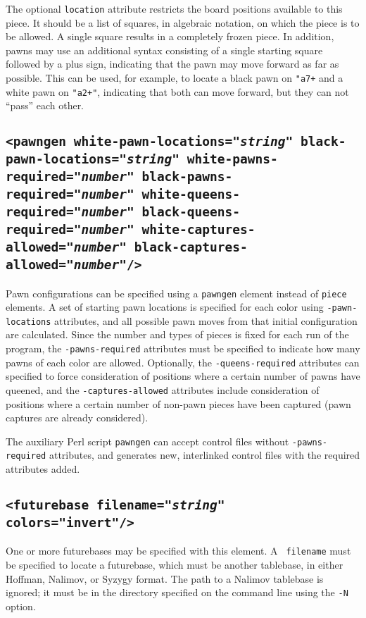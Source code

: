 \documentclass[11pt]{article}
\begin{document}
The optional {\tt location} attribute restricts the board positions
available to this piece.  It should be a list of squares, in algebraic
notation, on which the piece is to be allowed.  A single square
results in a completely frozen piece.  In addition, pawns may use an
additional syntax consisting of a single starting square followed by a
plus sign, indicating that the pawn may move forward as far as
possible.  This can be used, for example, to locate a black pawn on
{\tt "a7+} and a white pawn on {\tt "a2+"}, indicating that both can
move forward, but they can not ``pass'' each other.

\subsection{\tt <pawngen white-pawn-locations="{\it string}" black-pawn-locations="{\it string}" \hfil\break\hbox{\qquad} white-pawns-required="{\it number}" black-pawns-required="{\it number}" \hfil\break\hbox{\qquad} white-queens-required="{\it number}" black-queens-required="{\it number}" \hfil\break\hbox{\qquad} white-captures-allowed="{\it number}" black-captures-allowed="{\it number}"/>}

Pawn configurations can be specified using a {\tt pawngen} element
instead of {\tt piece} elements.  A set of starting pawn locations is
specified for each color using {\tt *-pawn-locations} attributes, and
all possible pawn moves from that initial configuration are
calculated.  Since the number and types of pieces is fixed for each
run of the program, the {\tt *-pawns-required} attributes must be
specified to indicate how many pawns of each color are allowed.
Optionally, the {\tt *-queens-required} attributes can specified to
force consideration of positions where a certain number of pawns have
queened, and the {\tt *-captures-allowed} attributes include
consideration of positions where a certain number of non-pawn pieces
have been captured (pawn captures are already considered).

The auxiliary Perl script {\tt pawngen} can accept control files
without {\tt *-pawns-required} attributes, and generates new,
interlinked control files with the required attributes added.

\subsection{\tt <futurebase filename="{\it string}" colors="invert"/>}

One or more futurebases may be specified with this element.  A {\tt
  filename} must be specified to locate a futurebase, which must be
another tablebase, in either Hoffman, Nalimov, or Syzygy format.  The
path to a Nalimov tablebase is ignored; it must be in the directory
specified on the command line using the {\tt -N} option.
\end{document}
